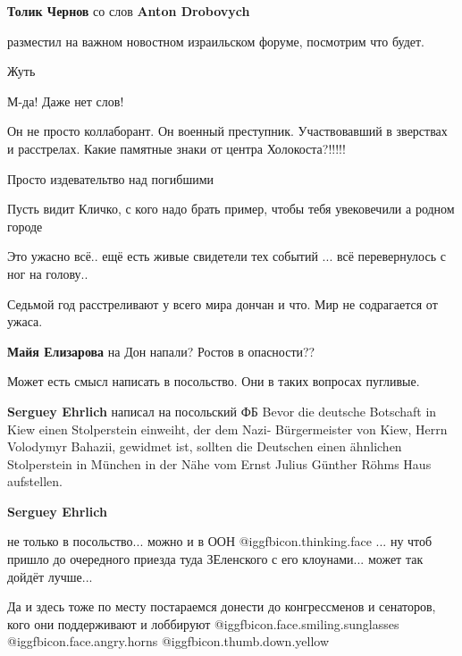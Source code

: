 \begin{itemize}
\begin{itemize} %
\textbf{Толик Чернов} со слов \textbf{Anton Drobovych}
\end{itemize} %

разместил на важном новостном израильском форуме, посмотрим что будет.

Жуть

М-да! Даже нет слов!

Он не просто коллаборант. Он военный преступник. Участвовавший в зверствах и расстрелах. Какие памятные знаки от центра Холокоста?!!!!!

Просто издевательтво над погибшими

Пусть видит Кличко, с кого надо брать пример, чтобы тебя увековечили а родном городе

Это ужасно всё.. ещё есть живые свидетели тех событий ... всё перевернулось с ног на голову..

Седьмой год расстреливают у всего мира дончан и что. Мир не содрагается от ужаса.

\begin{itemize} %
\textbf{Майя Елизарова} на Дон напали? Ростов в опасности??
\end{itemize} %

Может есть смысл написать в посольство. Они в таких вопросах пугливые.

\begin{itemize} %
\textbf{Serguey Ehrlich} написал на посольский ФБ
Bevor die deutsche Botschaft in Kiew einen Stolperstein einweiht, der dem Nazi- Bürgermeister von Kiew, Herrn Volodymyr Bahazii, gewidmet ist, sollten die Deutschen einen ähnlichen Stolperstein in München in der Nähe vom Ernst Julius Günther Röhms Haus aufstellen.

\textbf{Serguey Ehrlich} 

не только в посольство... можно и в ООН  @igg{fbicon.thinking.face} ... ну чтоб пришло до очередного
приезда туда ЗЕленского с его клоунами... может так дойдёт лучше...

Да и здесь тоже по месту постараемся донести до конгрессменов и сенаторов, кого
они поддерживают и лоббируют  @igg{fbicon.face.smiling.sunglasses}
@igg{fbicon.face.angry.horns}  @igg{fbicon.thumb.down.yellow} 


\end{itemize}
\end{itemize}

